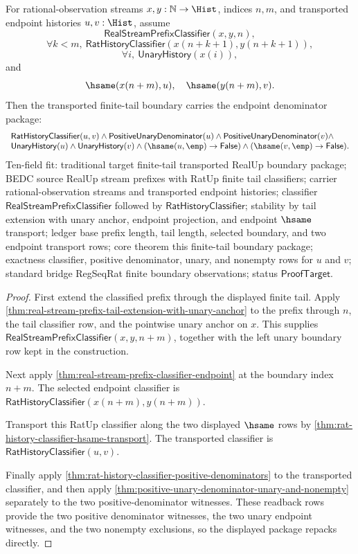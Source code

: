 \begin{theorem}
\label{thm:real-stream-prefix-finite-tail-transported-endpoint-denominator-package}
For rational-observation streams $x,y:\mathbb{N}\to\Hist$, indices $n,m$, and
transported endpoint histories $u,v:\Hist$, assume
$$
\mathsf{RealStreamPrefixClassifier}(x,y,n),
$$
$$
\forall k<m,\ \mathsf{RatHistoryClassifier}(x(n+k+1),y(n+k+1)),
$$
$$
\forall i,\ \mathsf{UnaryHistory}(x(i)),
$$
and
$$
\hsame(x(n+m),u),\quad \hsame(y(n+m),v).
$$
Then the transported finite-tail boundary carries the endpoint denominator
package:
$$
\begin{array}{l}
\mathsf{RatHistoryClassifier}(u,v)\land
\mathsf{PositiveUnaryDenominator}(u)\land
\mathsf{PositiveUnaryDenominator}(v)\land\\
\mathsf{UnaryHistory}(u)\land
\mathsf{UnaryHistory}(v)\land
(\hsame(u,\emp)\to\mathsf{False})\land
(\hsame(v,\emp)\to\mathsf{False}).
\end{array}
$$
Ten-field fit: traditional target finite-tail transported RealUp boundary
package; BEDC source RealUp stream prefixes with RatUp finite tail classifiers;
carrier rational-observation streams and transported endpoint histories;
classifier $\mathsf{RealStreamPrefixClassifier}$ followed by
$\mathsf{RatHistoryClassifier}$; stability by tail extension with unary anchor,
endpoint projection, and endpoint $\hsame$ transport; ledger base prefix length,
tail length, selected boundary, and two endpoint transport rows; core theorem
this finite-tail boundary package; exactness classifier, positive denominator,
unary, and nonempty rows for $u$ and $v$; standard bridge RegSeqRat finite
boundary observations; status $\mathsf{ProofTarget}$.
\end{theorem}
\begin{proof}
First extend the classified prefix through the displayed finite tail. Apply
\autoref{thm:real-stream-prefix-tail-extension-with-unary-anchor} to the prefix
through $n$, the tail classifier row, and the pointwise unary anchor on $x$.
This supplies $\mathsf{RealStreamPrefixClassifier}(x,y,n+m)$, together with the
left unary boundary row kept in the construction.

Next apply \autoref{thm:real-stream-prefix-classifier-endpoint} at the boundary
index $n+m$. The selected endpoint classifier is
$\mathsf{RatHistoryClassifier}(x(n+m),y(n+m))$.

Transport this RatUp classifier along the two displayed $\hsame$ rows by
\autoref{thm:rat-history-classifier-hsame-transport}. The transported classifier
is $\mathsf{RatHistoryClassifier}(u,v)$.

Finally apply \autoref{thm:rat-history-classifier-positive-denominators} to the
transported classifier, and then apply
\autoref{thm:positive-unary-denominator-unary-and-nonempty} separately to the
two positive-denominator witnesses. These readback rows provide the two
positive denominator witnesses, the two unary endpoint witnesses, and the two
nonempty exclusions, so the displayed package repacks directly.
\end{proof}

